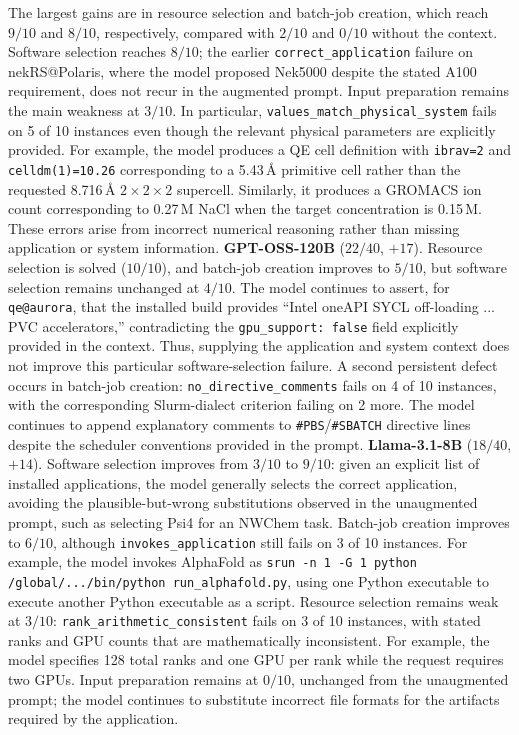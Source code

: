 \documentclass[conference]{IEEEtran}
\begin{document}
The largest gains are in resource selection and batch-job creation, which reach $9/10$ and $8/10$, respectively, compared with $2/10$ and $0/10$ without the context. Software selection reaches $8/10$; the earlier \texttt{correct\_application} failure on nekRS@Polaris, where the model proposed Nek5000 despite the stated A100 requirement, does not recur in the augmented prompt. Input preparation remains the main weakness at $3/10$. In particular, \texttt{values\_match\_physical\_system} fails on 5 of 10 instances even though the relevant physical parameters are explicitly provided. For example, the model produces a QE cell definition with \texttt{ibrav=2} and \texttt{celldm(1)=10.26} corresponding to a 5.43\,\AA{} primitive cell rather than the requested 8.716\,\AA{} $2\times2\times2$ supercell. Similarly, it produces a GROMACS ion count corresponding to 0.27\,M NaCl when the target concentration is 0.15\,M. These errors arise from incorrect numerical reasoning rather than missing application or system information.
\textbf{GPT-OSS-120B} ($22/40$, $+17$).
Resource selection is solved ($10/10$), and batch-job creation improves to $5/10$, but software selection remains unchanged at $4/10$. The model continues to assert, for \texttt{qe@aurora}, that the installed build provides ``Intel oneAPI SYCL off-loading ... PVC accelerators,'' contradicting the \texttt{gpu\_support: false} field explicitly provided in the context. Thus, supplying the application and system context does not improve this particular software-selection failure. A second persistent defect occurs in batch-job creation: \texttt{no\_directive\_comments} fails on 4 of 10 instances, with the corresponding Slurm-dialect criterion failing on 2 more. The model continues to append explanatory comments to \texttt{\#PBS}/\texttt{\#SBATCH} directive lines despite the scheduler conventions provided in the prompt.
\textbf{Llama-3.1-8B} ($18/40$, $+14$).
Software selection improves from $3/10$ to $9/10$: given an explicit list of installed applications, the model generally selects the correct application, avoiding the plausible-but-wrong substitutions observed in the unaugmented prompt, such as selecting Psi4 for an NWChem task. Batch-job creation improves to $6/10$, although \texttt{invokes\_application} still fails on 3 of 10 instances. For example, the model invokes AlphaFold as \texttt{srun -n 1 -G 1 python /global/.../bin/python run\_alphafold.py}, using one Python executable to execute another Python executable as a script. Resource selection remains weak at $3/10$: \texttt{rank\_arithmetic\_consistent} fails on 3 of 10 instances, with stated ranks and GPU counts that are mathematically inconsistent. For example, the model specifies 128 total ranks and one GPU per rank while the request requires two GPUs. Input preparation remains at $0/10$, unchanged from the unaugmented prompt; the model continues to substitute incorrect file formats for the artifacts required by the application.
\end{document}
